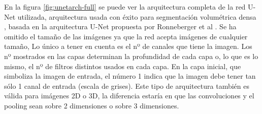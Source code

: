 En la figura \ref{fig:unetarch-full} se puede ver la arquitectura completa de la red U-Net utilizada, arquitectura usada con éxito para segmentación volumétrica densa \cite{Cicek2016}, basada en la arquitectura U-Net propuesta por Ronneberger et al \cite{Ronneberger2015}. Se ha omitido el tamaño de las imágenes ya que la red acepta imágenes de cualquier tamaño, Lo único a tener en cuenta es el nº de canales que tiene la imagen. Los nº mostrados en las capas determinan la profundidad de cada capa o, lo que es lo mismo, el nº de filtros distintos usados en cada capa. En la capa inicial, que simboliza la imagen de entrada, el número 1 indica que la imagen debe tener tan sólo 1 canal de entrada (escala de grises). Este tipo de arquitectura también es válida para imágenes 2D o 3D, la diferencia estaría en que las convoluciones y el pooling sean sobre 2 dimensiones o sobre 3 dimensiones.

